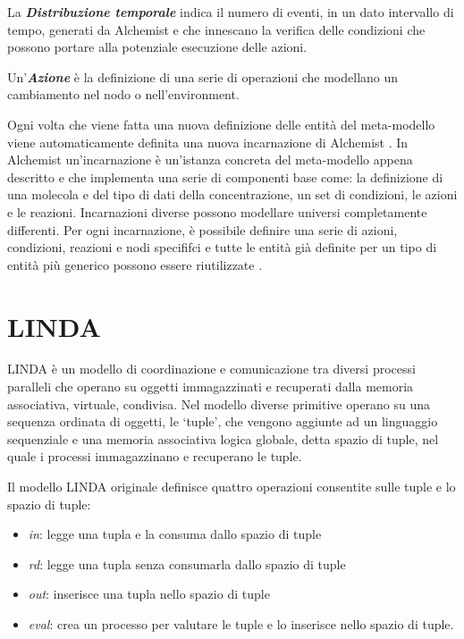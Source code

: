 La \textbf{\textit{Distribuzione temporale}} indica il numero di eventi, in un dato intervallo di tempo, generati da Alchemist e che innescano la verifica delle condizioni che possono portare alla potenziale esecuzione delle azioni.

Un'\textbf{\textit{Azione}} è la definizione di una serie di operazioni che modellano un cambiamento nel nodo o nell'environment.

Ogni volta che viene fatta una nuova definizione delle entità del meta-modello viene automaticamente definita una nuova incarnazione di Alchemist \cite{alchemist-jos2013}.
In Alchemist un'incarnazione è un'istanza concreta del meta-modello appena descritto e che implementa una serie di componenti base come: la definizione di una molecola e del tipo di dati della concentrazione, un set di condizioni, le azioni e le reazioni. Incarnazioni diverse possono modellare universi completamente differenti.
Per ogni incarnazione, è possibile definire una serie di azioni, condizioni, reazioni e nodi specififci e tutte le entità già definite per un tipo di entità più generico possono essere riutilizzate \cite{alchemist-jos2013}.

\section{LINDA}
LINDA è un modello di coordinazione e comunicazione tra diversi processi paralleli che operano su oggetti immagazzinati e recuperati dalla memoria associativa, virtuale, condivisa. Nel modello diverse primitive operano su una sequenza ordinata di oggetti, le `tuple', che vengono aggiunte ad un linguaggio sequenziale e una memoria associativa logica globale, detta spazio di tuple, nel quale i processi immagazzinano e recuperano le tuple.

Il modello LINDA originale definisce quattro operazioni consentite sulle tuple e lo spazio di tuple:
\begin{itemize}
\item \textit{in}: legge una tupla e la consuma dallo spazio di tuple
\item \textit{rd}: legge una tupla senza consumarla dallo spazio di tuple
\item \textit{out}: inserisce una tupla nello spazio di tuple
\item \textit{eval}: crea un processo per valutare le tuple e lo inserisce nello spazio di tuple.
\end{itemize}

